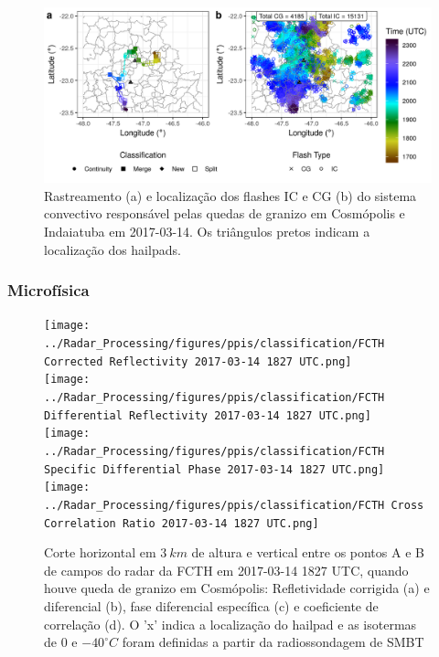 \begin{figure}[htb]
	\begin{center}
		\caption{Rastreamento (a) e localização dos flashes IC e CG (b) do sistema convectivo responsável pelas quedas de granizo em Cosmópolis e Indaiatuba em 2017-03-14. Os triângulos pretos indicam a localização dos hailpads.} 
		\label{track_flashes_20170314}
		\includegraphics[width=\columnwidth]{../General_Processing/figures/track_flashes_20170314.png}
	\end{center}
\end{figure}

\subsubsection{Microfísica}\label{micro_201703014}



\begin{figure}[hp]
	\centering
	\caption{Corte horizontal em $3\:km$ de altura e vertical entre os pontos A e B de campos do radar da FCTH em 2017-03-14 1827 UTC, quando houve queda de granizo em Cosmópolis: Refletividade corrigida (a) e diferencial (b), fase diferencial específica (c) e coeficiente de correlação (d). O 'x' indica a localização do hailpad e as isotermas de $0$ e $-40^{\circ}C$ foram definidas a partir da radiossondagem de SMBT}
	\label{radar_20170314_1}
	\vspace{-5pt}
	\texttt{[image: ../Radar\_Processing/figures/ppis/classification/FCTH Corrected Reflectivity 2017-03-14 1827 UTC.png]}
		\label{z_20170314_1} \\
	\vspace{-15pt}
	\texttt{[image: ../Radar\_Processing/figures/ppis/classification/FCTH Differential Reflectivity 2017-03-14 1827 UTC.png]}
		\label{zdr_20170314_1} \\
	\vspace{-15pt}
	\texttt{[image: ../Radar\_Processing/figures/ppis/classification/FCTH Specific Differential Phase 2017-03-14 1827 UTC.png]}
		\label{kdp_20170314_1} \\
	\vspace{-15pt}
	\texttt{[image: ../Radar\_Processing/figures/ppis/classification/FCTH Cross Correlation Ratio 2017-03-14 1827 UTC.png]}
		\label{rho_20170314_1} \\
	\vspace{-5pt}
\end{figure}

